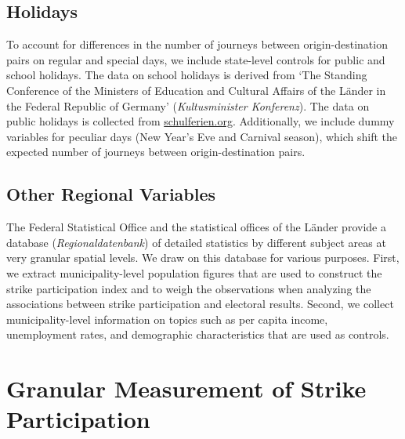 \subsection{Holidays}
To account for differences in the number of journeys between origin-destination pairs on regular and special days, we include state-level controls for public and school holidays. The data on school holidays is derived from `The Standing Conference of the Ministers of Education and Cultural Affairs of the Länder in the Federal Republic of Germany' (\textit{Kultusminister Konferenz}). The data on public holidays is collected from \url{schulferien.org}. Additionally, we include dummy variables for peculiar days (New Year's Eve and Carnival season), which shift the expected number of journeys between origin-destination pairs.







\subsection{Other Regional Variables}
The Federal Statistical Office and the statistical offices of the Länder provide a database (\textit{Regionaldatenbank}) of detailed statistics by different subject areas at very granular spatial levels. We draw on this database for various purposes. First, we extract municipality-level population figures that are used to construct the strike participation index and to weigh the observations when analyzing the associations between strike participation and electoral results. Second, we collect municipality-level information on topics such as per capita income, unemployment rates, and demographic characteristics that are used as controls.










\newpage
\section{Granular Measurement of Strike Participation}\label{sec_greta_cons:measurement_strike_participation}


